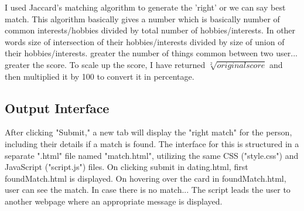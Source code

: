\documentclass[12pt,a4paper]{article}
\begin{document}
I used Jaccard's matching algorithm to generate the 'right' or we can say best match. This algorithm basically gives a number which is basically number of common interests/hobbies divided by total number of hobbies/interests. In other words size of intersection of their hobbies/interests divided by size of union of their hobbies/interests. greater the number of things common between two user... greater the score. To scale up the score, I have returned $\sqrt[2]{ original score}$
and then multiplied it by 100 to convert it in percentage. \\

\subsection{Output Interface}

After clicking "Submit," a new tab will display the "right match" for the person, including their details if a match is found. The interface for this is structured in a separate ".html" file named "match.html", utilizing the same CSS ("style.css") and JavaScript ("script.js") files.
On clicking submit in dating.html, first foundMatch.html is displayed. On hovering over the card in foundMatch.html, user can see the match. In case there is no match... The script leads the user to another webpage where an appropriate message is displayed.
% 
% 
% 
% 
% 
\end{document}
